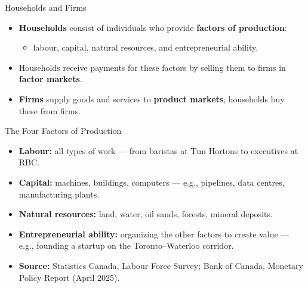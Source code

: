 \documentclass[aspectratio=169]{beamer}
\begin{document}
\begin{frame}{Households and Firms}
\transfade
\begin{itemize}
  \item \textbf{Households} consist of individuals who provide \textbf{factors of production}:
  \begin{itemize}
    \item labour, capital, natural resources, and entrepreneurial ability.
  \end{itemize}
  \item Households receive payments for these factors by selling them to firms in \textbf{factor markets}.
  \item \textbf{Firms} supply goods and services to \textbf{product markets}; households buy these from firms.
\end{itemize}
\end{frame}

\begin{frame}{The Four Factors of Production}
\transfade
\begin{itemize}
  \item \textbf{Labour:} all types of work --- from baristas at Tim Hortons to executives at RBC.
  \item \textbf{Capital:} machines, buildings, computers --- e.g., pipelines, data centres, manufacturing plants.
  \item \textbf{Natural resources:} land, water, oil sands, forests, mineral deposits.
  \item \textbf{Entrepreneurial ability:} organizing the other factors to create value --- e.g., founding a startup on the Toronto--Waterloo corridor.
  \item \textbf{Source:} Statistics Canada, Labour Force Survey; Bank of Canada, Monetary Policy Report (April 2025).
\end{itemize}
\end{frame}
\end{document}
